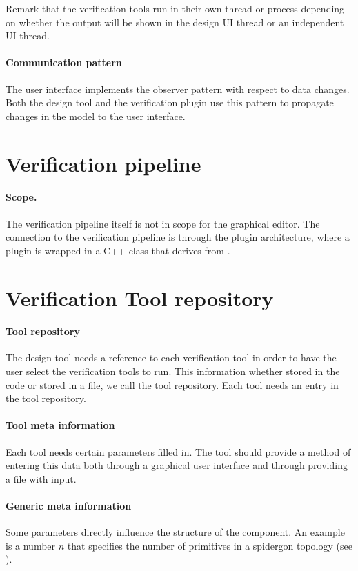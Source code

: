 Remark that the verification tools run in their own
thread or process depending on whether the output will be
shown in the design UI thread or an independent 
UI thread.

\paragraph{Communication pattern} The user interface implements
the observer pattern with respect to data changes.
Both the design tool and the verification plugin use this pattern to
propagate changes in the model to the user interface.

\section{Verification pipeline}

\paragraph{Scope.} The verification pipeline itself is
not in scope for the graphical editor. The connection to the verification 
pipeline is through the plugin architecture, where a plugin is wrapped 
in a C++ class that derives from .


\section{Verification Tool repository}

\paragraph{Tool repository} The design tool needs a reference to each 
verification tool in order to have the user select the 
verification tools to run. This information whether stored
in the code or stored in a file, we call the tool repository.
Each tool needs an entry in the tool repository.

\paragraph{Tool meta information} Each tool needs certain parameters 
filled in. The tool should provide a method of entering this data 
both through a graphical user interface and through providing a 
file with input.

\paragraph{Generic meta information} Some parameters directly influence 
the structure of the component. An example is a number $n$ that
specifies the number of primitives in a spidergon topology (see \cite{}).

